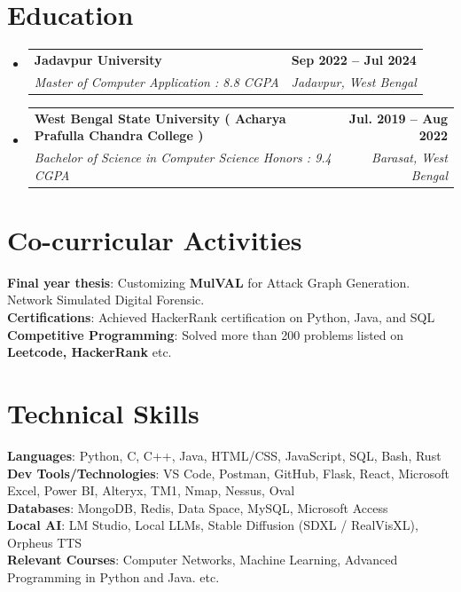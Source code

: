 \documentclass[letterpaper,11pt]{article}
\makeatletter
\newcommand{\resumeSubheading}[4]{
  \vspace{-2pt}\item
    \begin{tabular*}{1.0\textwidth}[t]{l@{\extracolsep{\fill}}r}
      \textbf{#1} & \textbf{\small #2} \\
      \textit{\small#3} & \textit{\small #4} \\
    \end{tabular*}\vspace{-7pt}
}
\newcommand{\resumeSubHeadingListStart}{\begin{itemize}[leftmargin=0.0in, label={}]}
\newcommand{\resumeSubHeadingListEnd}{\end{itemize}}
\makeatother
\begin{document}
\section{Education}
  \resumeSubHeadingListStart
    \resumeSubheading
      {Jadavpur University}{Sep 2022 -- Jul 2024}
      {Master of Computer Application : 8.8 CGPA}{Jadavpur, West Bengal}
    \resumeSubheading
      {West Bengal State University ( Acharya Prafulla Chandra College )}{Jul. 2019 -- Aug 2022}
      {Bachelor of Science in Computer Science Honors : 9.4 CGPA}{Barasat, West Bengal}
    
  \resumeSubHeadingListEnd
\vspace{-13pt}

\section{Co-curricular Activities}
\vspace{-0pt}
\textbf{Final year thesis}{: Customizing \textbf{MulVAL} for Attack Graph Generation. Network Simulated Digital Forensic.}
\\
\textbf{Certifications}{: Achieved HackerRank certification on Python, Java, and SQL}
\\
\textbf{Competitive Programming}{: Solved more than 200 problems listed on \textbf{Leetcode, HackerRank} etc.}
\\
\vspace{-13pt}

\section{Technical Skills}
     \textbf{Languages}{: Python, C, C++, Java, HTML/CSS, JavaScript, SQL, Bash, Rust} \\
     \textbf{Dev Tools/Technologies}{: VS Code, Postman, GitHub, Flask,  React, Microsoft Excel, Power BI, Alteryx, TM1, Nmap, Nessus, Oval} \\
     \textbf{Databases}{: MongoDB, Redis, Data Space, MySQL, Microsoft Access} \\
     \textbf{Local AI}{: LM Studio, Local LLMs, Stable Diffusion (SDXL / RealVisXL), Orpheus TTS} \\
     \textbf{Relevant Courses}{: Computer Networks, Machine Learning, Advanced Programming in Python and Java. etc.}
\end{document}
